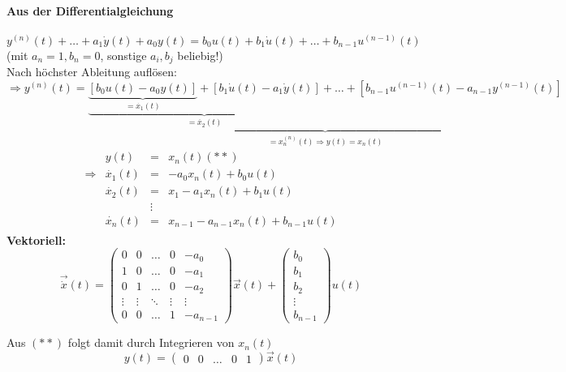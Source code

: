 \message{ !name(Mitschrieb_SysRegel.tex)}\documentclass[12pt,a4paper,ngerman]{scrartcl}
\begin{document}
\paragraph{Aus der Differentialgleichung}
\begin{equation*}
y^{(n)}(t)+\dots+a_1\dot{y}(t)+a_0y(t)=b_0u(t)+b_1\dot{u}(t)+\dots+b_{n-1}u^{(n-1)}(t)  
\end{equation*}
(mit $a_n=1, b_n=0$, sonstige $a_i, b_j$ beliebig!)\\
Nach höchster Ableitung auflösen:
\begin{equation*}
  \Rightarrow y^{(n)}(t)=\underbrace{\underbrace{\underbrace{[b_0u(t)-a_0y(t)]}_{=\dot{x_1}(t)}+[b_1\dot{u}(t)-a_1\dot{y}(t)]}_{=\ddot{x_2}(t)}+\dots+[b_{n-1}u^{(n-1)}(t)-a_{n-1}y^{(n-1)}(t)]}_{=x_n^{(n)}(t)\Rightarrow y(t)=x_n(t)}
\end{equation*}
\begin{align*}
  \begin{array}{lllll}
    &y(t)&=&x_n(t)(**) \\
    \Rightarrow&\dot{x_1}(t)&=&-a_0x_n(t)+b_0u(t)\\
    &\dot{x_2}(t)&=&x_1-a_1x_n(t)+b_1u(t)\\
    &&\vdots\\
    &\dot{x_n}(t)&=&x_{n-1}-a_{n-1}x_n(t)+b_{n-1}u(t)
  \end{array}
\end{align*}
\textbf{Vektoriell:}
\begin{equation*}
  \vec{\dot{x}}(t)=
  \begin{pmatrix}
    0&0&\dots&0&-a_0\\
    1&0&\dots&0&-a_1\\
    0&1&\dots&0&-a_2\\
    \vdots&\vdots&\ddots&\vdots&\vdots\\
    0&0&\dots&1&-a_{n-1}
  \end{pmatrix}
\vec{x}(t)+
\begin{pmatrix}
  b_0\\
  b_1\\
  b_2\\
\vdots\\
  b_{n-1}
\end{pmatrix}
u(t)
\end{equation*}

Aus $(**)$ folgt damit durch Integrieren von $x_n(t)$
\begin{equation*}
  y(t)=
  \begin{pmatrix}
    0&0&\dots&0&1
  \end{pmatrix}
\vec{x}(t)
\end{equation*}
\end{document}
